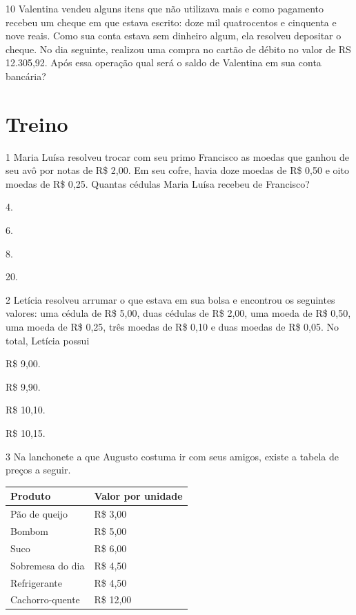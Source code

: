 \num{10} Valentina vendeu alguns itens que não utilizava mais e como pagamento
recebeu um cheque em que estava escrito: doze mil quatrocentos e
cinquenta e nove reais. Como sua conta estava sem dinheiro algum, ela
resolveu depositar o cheque. No dia seguinte, realizou uma compra no
cartão de débito no valor de RS 12.305,92. Após essa operação qual será o
saldo de Valentina em sua conta bancária?


\section{Treino}

\num{1} Maria Luísa resolveu trocar com seu primo Francisco as moedas que ganhou de seu avô por notas de
R\$ 2,00. Em seu cofre, havia doze moedas de R\$ 0,50
e oito moedas de R\$ 0,25. Quantas cédulas Maria Luísa recebeu de Francisco?

\begin{escolha}
\item
  4.
\item
  6.
\item
  8.
\item
  20.
\end{escolha}


\num{2} Letícia resolveu arrumar o que estava em sua bolsa e encontrou
os seguintes valores: uma cédula de R\$ 5,00, duas cédulas de R\$ 2,00, uma moeda de R\$ 0,50, uma moeda de R\$ 0,25, três moedas de R\$ 0,10 e duas moedas de R\$ 0,05. No total, Letícia possui

\begin{escolha}
\item
  R\$ 9,00.
\item
  R\$ 9,90.
\item
  R\$ 10,10.
\item
  R\$ 10,15.
\end{escolha}

\pagebreak

\num{3} Na lanchonete a que Augusto costuma ir com seus amigos, existe a tabela de preços a seguir.

\begin{longtable}[]{@{}ll@{}}
\toprule
Produto & Valor por unidade\tabularnewline
\midrule
\endhead
Pão de queijo & R\$ 3,00\tabularnewline
Bombom & R\$ 5,00\tabularnewline
Suco & R\$ 6,00\tabularnewline
Sobremesa do dia & R\$ 4,50\tabularnewline
Refrigerante & R\$ 4,50\tabularnewline
Cachorro-quente & R\$ 12,00\tabularnewline
\bottomrule
\end{longtable}

